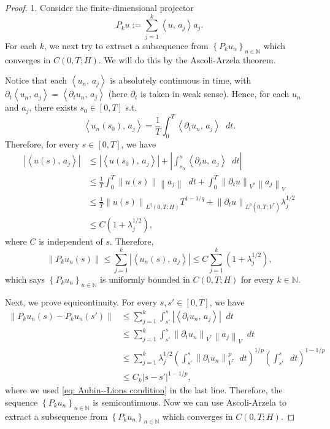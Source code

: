 \documentclass[a4paper, 12pt, oneside]{amsart}
\theoremstyle{definition}
\theoremstyle{remark}
\newcommand{\abs}[1]{\left\lvert #1 \right\rvert}
\newcommand{\norm}[1]{\left\lVert #1 \right\rVert}
\newcommand{\bk}[2]{\left\langle #1,\, #2 \right\rangle}
\newcommand{\set}[1]{\left\{ #1 \right\}}
\newcommand{\dt}{\mathop{}\!dt}
\renewcommand{\leq}{\leqslant}
\newcommand{\p}{\partial}
\newcommand{\N}{\mathbb{N}}
\begin{document}
\begin{proof}
    1. Consider the finite-dimensional projector
    \[
        P_k u := \sum_{j=1}^k \bk{u}{a_j}a_j.
    \]
    For each $k$, we next try to extract a subsequence from $\set{P_ku_n}_{n\in\N}$ which converges in $C(0, T; H)$. We will do this by the Ascoli-Arzela theorem.
    
    Notice that each $\bk{u_n}{a_j}$ is absolutely continuous in time, with $\p_t\bk{u_n}{a_j}=\bk{\p_tu_n}{a_j}$ (here $\p_t$ is taken in weak sense).
    Hence, for each $u_n$ and $a_j$, there exists $s_0\in [0, T]$ s.t.
    \[
        \bk{u_n(s_0)}{a_j} = \frac{1}{T}\int_0^T \bk{\p_t u_n}{a_j}\dt.
    \]
    Therefore, for every $s\in [0, T]$, we have
    \begin{align*}
        \abs{\bk{u(s)}{a_j}} &\leq\abs{\bk{u(s_0)}{a_j}} + \abs{\int_{s_0}^s \bk{\p_t u}{a_j}\dt}\\
        &\leq \frac{1}{T}\int_0^T \norm{u(s)}\norm{a_j}\dt + \int_0^T \norm{\p_t u}_{V^*}\norm{a_j}_V\\
        &\leq \frac{1}{T}\norm{u(s)}_{L^q(0, T; H)} T^{1-1/q} + \norm{\p_t u}_{L^p(0, T; V^*)}\lambda_j^{1/2}\\
        &\leq C(1+\lambda_j^{1/2}),
    \end{align*}
    where $C$ is independent of $s$. Therefore,
    \[
        \norm{P_ku_n(s)}\leq\sum_{j=1}^k\abs{\bk{u_n(s)}{a_j}}
        \leq C\sum_{j=1}^k (1+\lambda_j^{1/2}),
    \]
    which says $\set{P_ku_n}_{n\in\N}$ is uniformly bounded in $C(0, T; H)$ for every $k\in\N$.
    
    Next, we prove equicontinuity. For every $s, s'\in [0, T]$, we have
    \begin{align*}
        \norm{P_k u_n(s) - P_k u_n(s')}&\leq\sum_{j=1}^k\int_{s'}^s\abs{\bk{\p_tu_n}{a_j}}\dt\\
        &\leq\sum_{j=1}^k\int_{s'}^s\norm{\p_tu_n}_{V^*}\norm{a_j}_V\dt\\
        &\leq\sum_{j=1}^k\lambda_j^{1/2}\left(\int_{s'}^s\norm{\p_tu_n}_{V^*}^p\dt\right)^{1/p}\left(\int_{s'}^s\dt\right)^{1-1/p}\\
        &\leq C_k\abs{s-s'}^{1-1/p},
    \end{align*}
    where we used \eqref{eq: Aubin--Lions condition} in the last line. Therefore, the sequence $\set{P_ku_n}_{n\in\N}$ is semicontinuous. Now we can use Ascoli-Arzela to extract a subsequence from $\set{P_ku_n}_{n\in\N}$ which converges in $C(0, T; H)$.
    

\end{proof}
\end{document}
